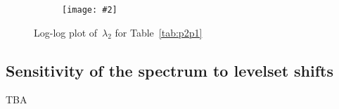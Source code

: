\documentclass[12pt]{article}
\newcommand{\includegraphicsw}[2][1.]{\texttt{[image: \#2]}}
\newcommand{\vect}[1]{\boldsymbol{\mathbf{#1}}}
\newcommand{\sphere}{{\Gamma_{\text{sph}}}}
\newcommand{\tor}{{\Gamma_{\text{tor}}}}
\begin{document}
\vfill
\begin{figure}[h]
	\centering\small
	\begin{subfigure}{.49\linewidth}
		\centering
		\includegraphicsw{sphere_2_P2P1_consistent.png}
	\end{subfigure}%
	\caption{Log-log plot of~$\lambda_2$ for Table~\ref{tab:p2p1}}
\end{figure}
\vfill
\subsection{Sensitivity of the spectrum to levelset shifts}
TBA
\clearpage
%			
%			
\end{document}
